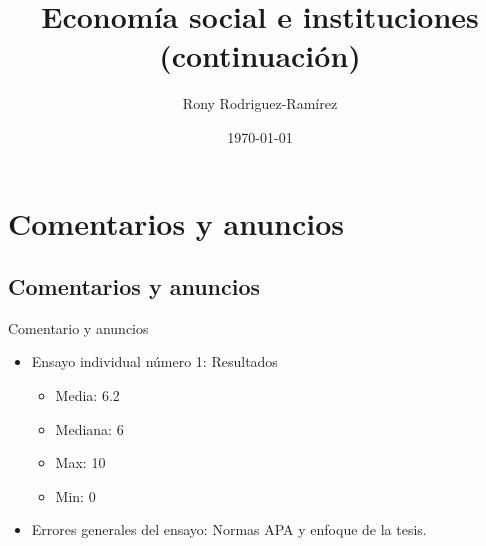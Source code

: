 \documentclass[11pt, aspectratio=169, compress]{beamer}
\title{Economía social e instituciones (continuación)}
\author{Rony Rodriguez-Ramírez}
\institute{Economía Social y Humana | Grupo B018 \\Universidad Centroamericana}
\date{\today}
\begin{document}
	
\begin{frame}[plain]
	\maketitle  
\end{frame}

\section{Comentarios y anuncios}
\subsection{Comentarios y anuncios}
\begin{frame}{Comentario y anuncios}
\begin{itemize}
	\item Ensayo individual número 1: Resultados
	\begin{itemize}
		\item Media: 6.2 
		\item Mediana: 6 
		\item Max: 10 
		\item Min: 0
	\end{itemize}
	\item Errores generales del ensayo: Normas APA y enfoque de la tesis. 
	
\end{itemize}
\end{frame}
\end{document}
